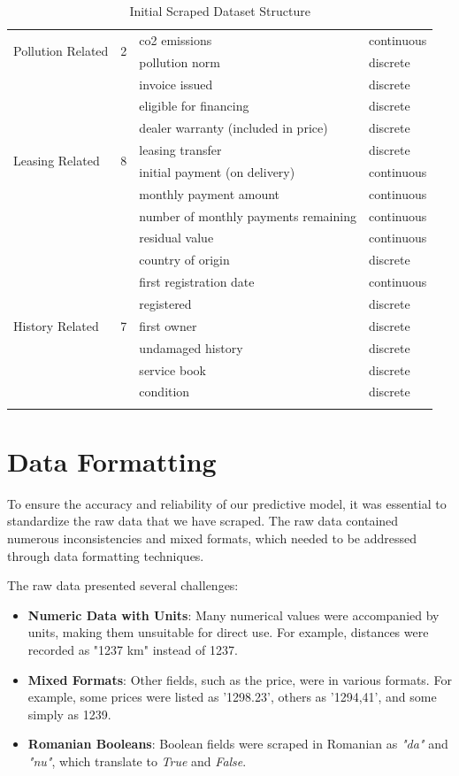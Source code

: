 \begin{longtable}{llll}
    \multirow{2}{*}{Pollution Related} & \multirow{2}{*}{2} & co2 emissions & continuous \\ 
    & & pollution norm & discrete \\ \hline
    
    \multirow{8}{*}{Leasing Related} & \multirow{8}{*}{8} & invoice issued & discrete \\ 
    & & eligible for financing & discrete \\ 
    & & dealer warranty (included in price) & discrete \\ 
    & & leasing transfer & discrete \\ 
    & & initial payment (on delivery) & continuous \\ 
    & & monthly payment amount & continuous \\ 
    & & number of monthly payments remaining & continuous \\ 
    & & residual value & continuous \\ \hline
    
    \multirow{7}{*}{History Related} & \multirow{7}{*}{7} & country of origin & discrete \\ 
    & & first registration date & continuous \\ 
    & & registered & discrete \\ 
    & & first owner & discrete \\ 
    & & undamaged history & discrete \\ 
    & & service book & discrete \\ 
    & & condition & discrete \\ \hline
    \caption{Initial Scraped Dataset Structure}
    \label{tab:scraped-table}
\end{longtable}

\section{Data Formatting}

To ensure the accuracy and reliability of our predictive model, it was essential to standardize the raw data that we have scraped. The raw data contained numerous inconsistencies and mixed formats, which needed to be addressed through data formatting techniques.

The raw data presented several challenges:
\begin{itemize}
    \item \textbf{Numeric Data with Units}: Many numerical values were accompanied by units, making them unsuitable for direct use. For example, distances were recorded as "1237 km" instead of 1237.
    \item \textbf{Mixed Formats}: Other fields, such as the price, were in various formats. For example, some prices were listed as '1298.23', others as '1294,41', and some simply as 1239.
    \item \textbf{Romanian Booleans}: Boolean fields were scraped in Romanian as \textit{"da"} and \textit{"nu"}, which translate to \textit{True} and \textit{False}.
\end{itemize}

